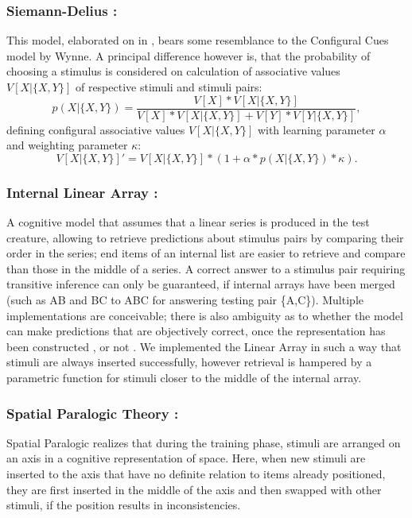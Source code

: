 \documentclass[10pt,letterpaper]{article}
\begin{document}
	\subsubsection{Siemann-Delius \cite{siemann1998}:} This model, elaborated on in \cite{guez2013}, bears some resemblance to the Configural Cues model by Wynne. A principal difference however is, that the probability of choosing a stimulus is considered on calculation of associative values $V[X|\{X,Y\}]$ of respective stimuli and stimuli pairs:
	\begin{equation*}
	p(X|\{X,Y\}) = \frac{V[X] * V[X|\{X,Y\}]}{V[X] * V[X|\{X,Y\}] + V[Y] * V[Y|\{X,Y\}]},
	\end{equation*}
	defining configural associative values $V[X|\{X,Y\}]$ with learning parameter $\alpha$ and weighting parameter $\kappa$:
	\begin{equation*}
	V[X|\{X,Y\}] '= V[X|\{X,Y\}] * (1 + \alpha * p(X|\{X,Y\}) * \kappa).
	\end{equation*}
	\subsubsection{Internal Linear Array  \cite{trabasso1975}:} A cognitive model that assumes that a linear series is produced in the test creature, allowing to retrieve predictions about stimulus pairs by comparing their order in the series; end items of an internal list are easier to retrieve and compare than those in the middle of a series. A correct answer to a stimulus pair requiring transitive inference can only be guaranteed, if internal arrays have been merged (such as AB and BC to ABC for answering testing pair \{A,C\}). Multiple implementations are conceivable; there is also ambiguity as to whether the model can make predictions that are objectively correct, once the representation has been constructed \cite{lazareva2012}, or not \cite{trabasso1975}. We implemented the Linear Array in such a way that stimuli are always inserted successfully, however retrieval is hampered by a parametric function for stimuli closer to the middle of the internal array.
	
	\subsubsection{Spatial Paralogic Theory \cite{desoto1965}:} Spatial Paralogic realizes that during the training phase, stimuli are arranged on an axis in a cognitive representation of space. Here, when new stimuli are inserted to the axis that have no definite relation to items already positioned, they are first inserted in the middle of the axis and then swapped with other stimuli, if the position results in inconsistencies. 
	
\end{document}
